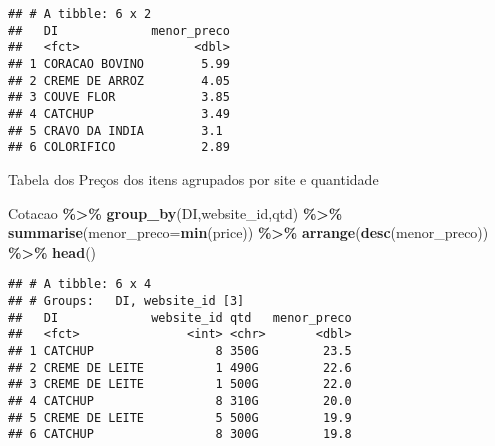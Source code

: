 \documentclass[
]{article}
\newenvironment{Shaded}{\begin{snugshade}}{\end{snugshade}}
\newcommand{\DataTypeTok}[1]{\textcolor[rgb]{0.13,0.29,0.53}{#1}}
\newcommand{\KeywordTok}[1]{\textcolor[rgb]{0.13,0.29,0.53}{\textbf{#1}}}
\newcommand{\NormalTok}[1]{#1}
\newcommand{\OperatorTok}[1]{\textcolor[rgb]{0.81,0.36,0.00}{\textbf{#1}}}
\newcommand{\StringTok}[1]{\textcolor[rgb]{0.31,0.60,0.02}{#1}}
\begin{document}
\begin{verbatim}
## # A tibble: 6 x 2
##   DI             menor_preco
##   <fct>                <dbl>
## 1 CORACAO BOVINO        5.99
## 2 CREME DE ARROZ        4.05
## 3 COUVE FLOR            3.85
## 4 CATCHUP               3.49
## 5 CRAVO DA INDIA        3.1 
## 6 COLORIFICO            2.89
\end{verbatim}

Tabela dos Preços dos itens agrupados por site e quantidade

\begin{Shaded}
\begin{Highlighting}[]
\NormalTok{Cotacao }\OperatorTok{\%\textgreater{}\%}\StringTok{ }\KeywordTok{group\_by}\NormalTok{(DI,website\_id,qtd) }\OperatorTok{\%\textgreater{}\%}\StringTok{ }\KeywordTok{summarise}\NormalTok{(}\DataTypeTok{menor\_preco=}\KeywordTok{min}\NormalTok{(price)) }\OperatorTok{\%\textgreater{}\%}\StringTok{ }
\StringTok{    }\KeywordTok{arrange}\NormalTok{(}\KeywordTok{desc}\NormalTok{(menor\_preco)) }\OperatorTok{\%\textgreater{}\%}\StringTok{ }\KeywordTok{head}\NormalTok{()}
\end{Highlighting}
\end{Shaded}

\begin{verbatim}
## # A tibble: 6 x 4
## # Groups:   DI, website_id [3]
##   DI             website_id qtd   menor_preco
##   <fct>               <int> <chr>       <dbl>
## 1 CATCHUP                 8 350G         23.5
## 2 CREME DE LEITE          1 490G         22.6
## 3 CREME DE LEITE          1 500G         22.0
## 4 CATCHUP                 8 310G         20.0
## 5 CREME DE LEITE          5 500G         19.9
## 6 CATCHUP                 8 300G         19.8
\end{verbatim}
\end{document}
